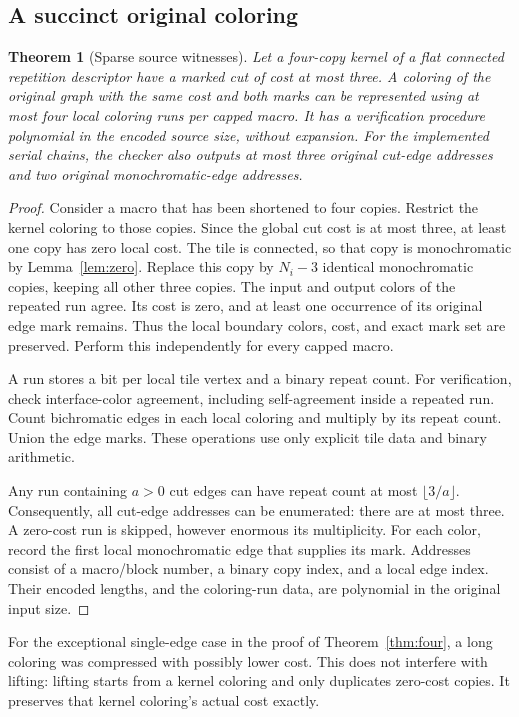 \documentclass[11pt]{article}
\newtheorem{theorem}{Theorem}[section]
\theoremstyle{remark}\newtheorem{remark}[theorem]{Remark}
\begin{document}
\subsection{A succinct original coloring}
\begin{theorem}[Sparse source witnesses]
\label{thm:lift}
Let a four-copy kernel of a flat connected repetition descriptor have a marked cut of cost at most three. A coloring of the original graph with the same cost and both marks can be represented using at most four local coloring runs per capped macro. It has a verification procedure polynomial in the encoded source size, without expansion. For the implemented serial chains, the checker also outputs at most three original cut-edge addresses and two original monochromatic-edge addresses.
\end{theorem}
\begin{proof}
Consider a macro that has been shortened to four copies. Restrict the kernel coloring to those copies. Since the global cut cost is at most three, at least one copy has zero local cost. The tile is connected, so that copy is monochromatic by Lemma~\ref{lem:zero}. Replace this copy by $N_i-3$ identical monochromatic copies, keeping all other three copies. The input and output colors of the repeated run agree. Its cost is zero, and at least one occurrence of its original edge mark remains. Thus the local boundary colors, cost, and exact mark set are preserved. Perform this independently for every capped macro.

A run stores a bit per local tile vertex and a binary repeat count. For verification, check interface-color agreement, including self-agreement inside a repeated run. Count bichromatic edges in each local coloring and multiply by its repeat count. Union the edge marks. These operations use only explicit tile data and binary arithmetic.

Any run containing $a>0$ cut edges can have repeat count at most $\lfloor3/a\rfloor$. Consequently, all cut-edge addresses can be enumerated: there are at most three. A zero-cost run is skipped, however enormous its multiplicity. For each color, record the first local monochromatic edge that supplies its mark. Addresses consist of a macro/block number, a binary copy index, and a local edge index. Their encoded lengths, and the coloring-run data, are polynomial in the original input size.
\end{proof}

For the exceptional single-edge case in the proof of Theorem~\ref{thm:four}, a long coloring was compressed with possibly lower cost. This does not interfere with lifting: lifting starts from a kernel coloring and only duplicates zero-cost copies. It preserves that kernel coloring's actual cost exactly.
\end{document}
